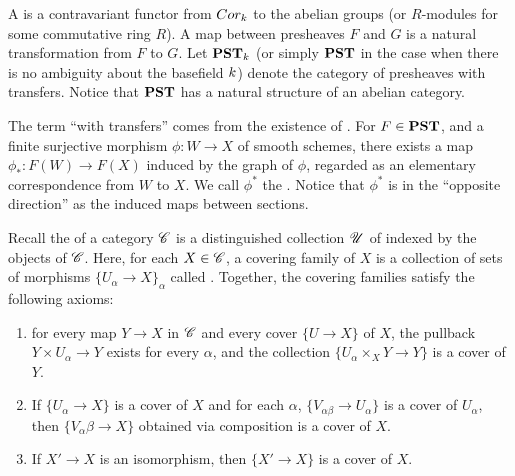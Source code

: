 \begin{defn}\label{def_pst}
A  is a contravariant functor from 
$Cor_k$ to the abelian groups (or $R$-modules for some 
commutative ring $R$). A map between presheaves $F$ and $G$ is a 
natural transformation from $F$ to $G$. Let $\mathbf{PST}_{k}$ (or
simply $\mathbf{PST}$ in the case when there is no ambiguity about the 
basefield $k$) denote the category of presheaves with 
transfers. Notice that $\mathbf{PST}$ has a natural structure of an abelian
category.
\end{defn}

\begin{rmk}
The term ``with transfers'' comes from the existence of 
. For $F \in \mathbf{PST}$, and a finite surjective
morphism $\phi : W \to X$ of smooth schemes, there exists a
map $\phi_*: F(W) \to F(X)$ induced by the graph of $\phi$,
regarded as an elementary correspondence from $W$ to $X$.
We call $\phi^*$ the . Notice that $\phi^*$
is in the ``opposite direction'' as the induced maps between
sections.
\end{rmk}

\begin{defn}\label{def_groth_top}
Recall the  of a category $\mathscr{C}$ 
is a distinguished collection $\mathscr{U}$ of  
indexed by the objects of $\mathscr{C}$. Here, for each $X \in \mathscr{C}$,
a covering family of $X$ is a collection of sets of morphisms 
$\{U_\alpha \to X\}_\alpha$ called . Together, 
the covering families satisfy the following axioms:

\begin{enumerate}
\item for every map $Y \to X$ in $\mathscr{C}$ and every cover $\{U 
\to X\}$ of $X$, the pullback $Y \times U_\alpha \to Y$ exists 
for every $\alpha$, and the collection $\{U_\alpha \times_X Y \to
Y\}$ is a cover of $Y$.

\item If $\{U_\alpha \to X\}$ is a cover of $X$ and for each 
$\alpha$, $\{V_{\alpha\beta} \to U_\alpha\}$ is a cover of 
$U_\alpha$, then $\{V_\alpha\beta \to X\}$ obtained via 
composition is a cover of $X$.

\item If $X' \to X$ is an isomorphism, then $\{X' \to X\}$ is a 
cover of $X$.
\end{enumerate}
\end{defn}

